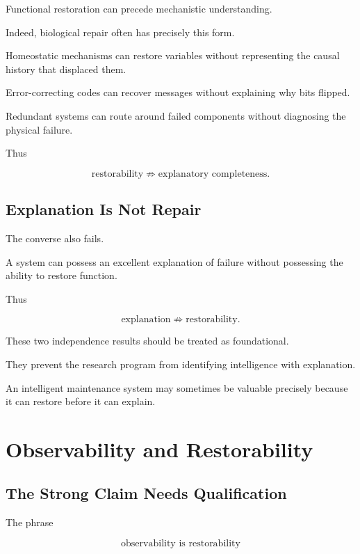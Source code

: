 \documentclass[11pt]{article}
\theoremstyle{remark}
\begin{document}
Functional restoration can precede mechanistic understanding.

Indeed, biological repair often has precisely this form.

Homeostatic mechanisms can restore variables without representing the causal history that displaced them.

Error-correcting codes can recover messages without explaining why bits flipped.

Redundant systems can route around failed components without diagnosing the physical failure.

Thus

\begin{equation}
\boxed{
\text{restorability}
\not\Rightarrow
\text{explanatory completeness}.
}
\end{equation}

\subsection{Explanation Is Not Repair}

The converse also fails.

A system can possess an excellent explanation of failure without possessing the ability to restore function.

Thus

\begin{equation}
\boxed{
\text{explanation}
\not\Rightarrow
\text{restorability}.
}
\end{equation}

These two independence results should be treated as foundational.

They prevent the research program from identifying intelligence with explanation.

An intelligent maintenance system may sometimes be valuable precisely because it can restore before it can explain.

\section{Observability and Restorability}

\subsection{The Strong Claim Needs Qualification}

The phrase

\begin{equation}
\text{observability is restorability}
\end{equation}
\end{document}
